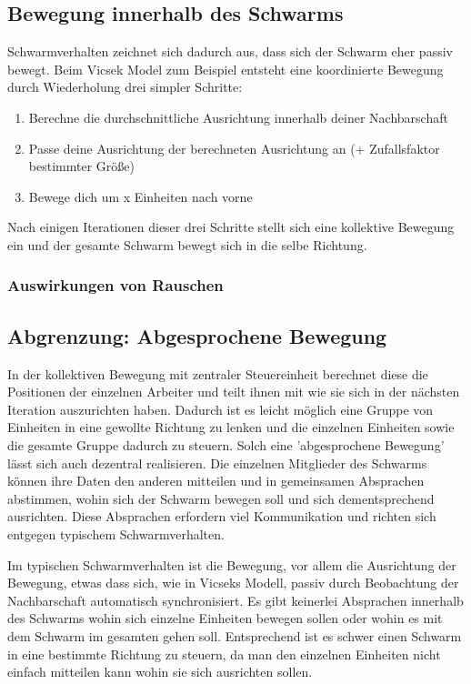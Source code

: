 \subsection{Bewegung innerhalb des Schwarms}\label{subsec:BewegungImSchwarm}
Schwarmverhalten zeichnet sich dadurch aus, dass sich der Schwarm eher passiv bewegt.
Beim Vicsek Model 
zum Beispiel entsteht eine koordinierte Bewegung durch Wiederholung drei simpler Schritte:

\begin{enumerate}
	\item Berechne die durchschnittliche Ausrichtung innerhalb deiner Nachbarschaft
	\item Passe deine Ausrichtung der berechneten Ausrichtung an (+ Zufallsfaktor bestimmter Größe)
	\item Bewege dich um x Einheiten nach vorne
\end{enumerate}

Nach einigen Iterationen dieser drei Schritte stellt sich eine kollektive Bewegung ein und der gesamte Schwarm bewegt sich in die selbe Richtung.

\subsubsection{Auswirkungen von Rauschen}\label{subsubsec:AuswirkungenVonRauschen}
\lorem

\subsection{Abgrenzung: Abgesprochene Bewegung}\label{subsec:AbgesprocheneBewegung}
In der kollektiven Bewegung mit zentraler Steuereinheit berechnet diese die Positionen der einzelnen Arbeiter und teilt ihnen mit wie sie sich in der nächsten Iteration auszurichten haben.
Dadurch ist es leicht möglich eine Gruppe von Einheiten in eine gewollte Richtung zu lenken und die einzelnen Einheiten sowie die gesamte Gruppe dadurch zu steuern.
Solch eine 'abgesprochene Bewegung' lässt sich auch dezentral realisieren.
Die einzelnen Mitglieder des Schwarms können ihre Daten den anderen mitteilen und in gemeinsamen Absprachen abstimmen, wohin sich der Schwarm bewegen soll und sich dementsprechend ausrichten.
Diese Absprachen erfordern viel Kommunikation und richten sich entgegen typischem Schwarmverhalten.

Im typischen Schwarmverhalten ist die Bewegung, vor allem die Ausrichtung der Bewegung, etwas dass sich, wie in Vicseks Modell, passiv durch Beobachtung der Nachbarschaft automatisch synchronisiert.
Es gibt keinerlei Absprachen innerhalb des Schwarms wohin sich einzelne Einheiten bewegen sollen oder wohin es mit dem Schwarm im gesamten gehen soll.
Entsprechend ist es schwer einen Schwarm in eine bestimmte Richtung zu steuern, da man den einzelnen Einheiten nicht einfach mitteilen kann wohin sie sich ausrichten sollen.

